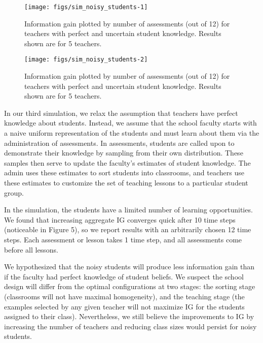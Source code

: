 \documentclass[10pt, letterpaper]{article}
\newenvironment{CodeChunk}{}{}
\begin{document}
\begin{CodeChunk}
\begin{figure*}[t]
\texttt{[image: figs/sim\_noisy\_students-1]} \caption[Information gain plotted by number of assessments (out of 12) for teachers with perfect and uncertain student knowledge]{Information gain plotted by number of assessments (out of 12) for teachers with perfect and uncertain student knowledge. Results shown are for 5 teachers.}\label{fig:sim_noisy_students1}
\end{figure*}
\begin{figure*}[t]
\texttt{[image: figs/sim\_noisy\_students-2]} \caption[Information gain plotted by number of assessments (out of 12) for teachers with perfect and uncertain student knowledge]{Information gain plotted by number of assessments (out of 12) for teachers with perfect and uncertain student knowledge. Results shown are for 5 teachers.}\label{fig:sim_noisy_students2}
\end{figure*}
\end{CodeChunk}

In our third simulation, we relax the assumption that teachers have
perfect knowledge about students. Instead, we assume that the school
faculty starts with a naive uniform representation of the students and
must learn about them via the administration of assessments. In
assessments, students are called upon to demonstrate their knowledge by
sampling from their own distribution. These samples then serve to update
the faculty's estimates of student knowledge. The admin uses these
estimates to sort students into classrooms, and teachers use these
estimates to customize the set of teaching lessons to a particular
student group.

In the simulation, the students have a limited number of learning
opportunities. We found that increasing aggregate IG converges quick
after 10 time steps (noticeable in Figure 5), so we report results with
an arbitrarily chosen 12 time steps. Each assessment or lesson takes 1
time step, and all assessments come before all lessons.

We hypothesized that the noisy students will produce less information
gain than if the faculty had perfect knowledge of student beliefs. We
suspect the school design will differ from the optimal configurations at
two stages: the sorting stage (classrooms will not have maximal
homogeneity), and the teaching stage (the examples selected by any given
teacher will not maximize IG for the students assigned to their class).
Nevertheless, we still believe the improvements to IG by increasing the
number of teachers and reducing class sizes would persist for noisy
students.
\end{document}
